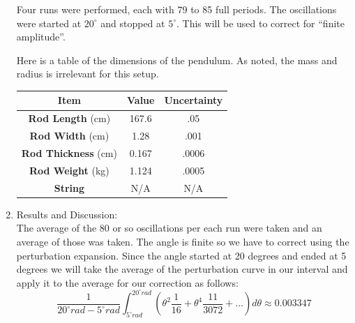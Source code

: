 \documentclass[12pt]{article}
\begin{document}
\begin{enumerate}[label=(\alph*)]
        Four runs were performed, each with 79 to 85 full periods. The oscillations were started at $20^\circ$ and stopped at $5^\circ$. This will be used to correct for ``finite amplitude''.

        Here is a table of the dimensions of the pendulum. As noted, the mass and radius is irrelevant for this setup.\\

        \begin{center}
            \begin{tabular}{ ||c||c|c|| } 
                \hline
                \textbf{Item} & Value & Uncertainty \\ 
                \hline
                \textbf{Rod Length} (cm) & 167.6 & .05\\ 
                \textbf{Rod Width} (cm) & 1.28 & .001\\ 
                \textbf{Rod Thickness} (cm) & 0.167 & .0006\\ 
                \textbf{Rod Weight} (kg) & 1.124 & .0005\\ 
                \textbf{String} & N/A & N/A\\ 
                \hline
            \end{tabular}
        \end{center}

        \item Results and Discussion:\\
            The average of the 80 or so oscillations per each run were taken and an average of those was taken. The angle is finite so we have to correct using the perturbation expansion. Since the angle started at 20 degrees and ended at 5 degrees we will take the average of the perturbation curve in our interval and apply it to the average for our correction as follows:
            \[
                \frac{1}{20^\circ rad - 5^\circ rad} \int_{5^\circ rad}^{20^\circ rad} \left( \theta^2 \frac{1}{16} + \theta^4 \frac{11}{3072} + \dots \right) d \theta \approx 0.003347
            \]


\end{enumerate}
\end{document}
